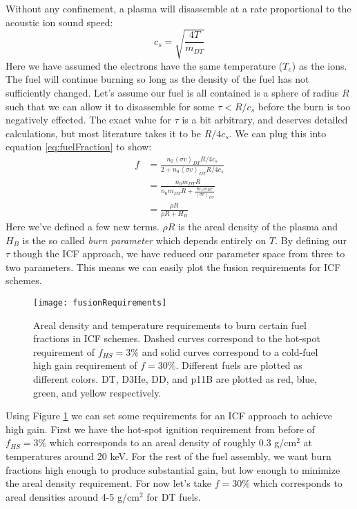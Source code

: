 	Without any confinement, a plasma will disassemble at a rate proportional to the acoustic ion sound speed:
	\begin{equation}
		c_s = \sqrt{\frac{4T}{m_{DT}}}
	\end{equation}
	Here we have assumed the electrons have the same temperature ($T_e$) as the ions. The fuel will continue burning so long as the density of the fuel has not sufficiently changed. Let's assume our fuel is all contained is a sphere of radius $R$ such that we can allow it to disassemble for some $\tau< R/c_s$ before the burn is too negatively effected. The exact value for $\tau$ is a bit arbitrary, and deserves detailed calculations, but most literature takes it to be $R/4c_s$. We can plug this into equation \ref{eq:fuelFraction} to show:
	\begin{equation}
		\begin{split}
			f &= \frac{n_0\left<\sigma v\right>_{DT} R / 4c_s}{2 + n_0\left<\sigma v\right>_{DT} R / 4c_s} \\
			& = \frac{n_0m_{DT}R}{n_0m_{DT}R + \frac{8 c_s m_{DT}}{\left<\sigma v\right>_{DT}}}\\
			&= \frac{\rho R}{\rho R + H_B}
		\end{split}
		\label{eq:burnFraction}
	\end{equation}
	Here we've defined a few new terms. $\rho R$ is the areal density of the plasma and $H_B$ is the so called \emph{burn parameter} which depends entirely on $T$. By defining our $\tau$ though the ICF approach, we have reduced our parameter space from three to two parameters. This means we can easily plot the fusion requirements for ICF schemes. 
	
		\begin{figure}[h!]
		\centering
		\texttt{[image: fusionRequirements]}
		\caption[ICF Fusion Requirements]{Areal density and temperature requirements to burn certain fuel fractions in ICF schemes. Dashed curves correspond to the hot-spot requirement of $f_{HS}=3\%$ and solid curves correspond to a cold-fuel high gain requirement of $f=30\%$. Different fuels are plotted as different colors. DT, D3He, DD, and p11B are plotted as red, blue, green, and yellow respectively.  }
		\label{fig:fusionRequirements}
	\end{figure}

	Using Figure \ref{fig:fusionRequirements} we can set some requirements for an ICF approach to achieve high gain. First we have the hot-spot ignition requirement from before of $f_{HS}=3\%$ which corresponds to an areal density of roughly 0.3 g/cm$^2$ at temperatures around 20 keV. For the rest of the fuel assembly, we want burn fractions high enough to produce substantial gain, but low enough to minimize the areal density requirement. For now let's take $f=30\%$ which corresponds to areal densities around 4-5 g/cm$^2$ for DT fuels. 
	
